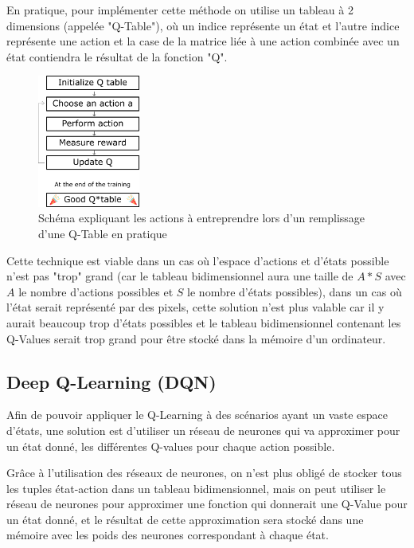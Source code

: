 \documentclass[a4paper,10pt,openany,oneside]{report}
\begin{document}
En pratique, pour implémenter cette méthode on utilise un tableau à 2 dimensions (appelée "Q-Table"), où un indice représente un état et l'autre indice représente une action et la case de la matrice liée à une action combinée avec un état contiendra le résultat de la fonction "Q".

\begin{figure}[H]
	\centering
	\includegraphics[width=0.3\textwidth]{img/qtable.png}
	\caption{Schéma expliquant les actions à entreprendre lors d'un remplissage d'une Q-Table en pratique \cite[]{freecodecamp}}
\end{figure}

Cette technique est viable dans un cas où l'espace d'actions et d'états possible n'est pas "trop" grand (car le tableau bidimensionnel aura une taille de $A*S$ avec $A$ le nombre d'actions possibles et $S$ le nombre d'états possibles), dans un cas où l'état serait représenté par des pixels, cette solution n'est plus valable car il y aurait beaucoup trop d'états possibles et le tableau bidimensionnel contenant les Q-Values serait trop grand pour être stocké dans la mémoire d'un ordinateur.
\subsection{Deep Q-Learning (DQN)}
Afin de pouvoir appliquer le Q-Learning à des scénarios ayant un vaste espace d'états, une solution est d'utiliser un réseau de neurones qui va approximer pour un état donné, les différentes Q-values pour chaque action possible.\cite[]{freecodecamp}

Grâce à l'utilisation des réseaux de neurones, on n'est plus obligé de stocker tous les tuples état-action dans un tableau bidimensionnel, mais on peut utiliser le réseau de neurones pour approximer une fonction qui donnerait une Q-Value pour un état donné, et le résultat de cette approximation sera stocké dans une mémoire avec les poids des neurones correspondant à chaque état.
\end{document}
